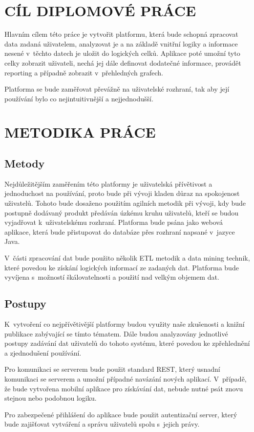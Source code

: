 \chapter*{CÍL DIPLOMOVÉ PRÁCE}
Hlavním cílem této práce je vytvořit platformu, která bude schopná zpracovat data zadaná uživatelem, analyzovat je a na základě vnitřní logiky a informace nesené v~těchto datech je uložit do logických celků. Aplikace poté umožní tyto celky zobrazit uživateli, nechá jej dále definovat dodatečné informace, provádět reporting a případně zobrazit v~přehledných grafech.

Platforma se bude zaměřovat převážně na uživatelské rozhraní, tak aby její používání bylo co nejintuitivnější a nejjednodušší.

\chapter*{METODIKA PRÁCE}
\section*{Metody}
\par Nejdůležitějším zaměřením této platformy je uživatelská přívětivost a jednoduchost na používání, proto bude při vývoji kladen důraz na spokojenost uživatelů. Tohoto bude dosaženo použitím agilních metodik při vývoji, kdy bude postupně dodávaný produkt předáván úzkému kruhu uživatelů, kteří se budou vyjadřovat k~uživatelskému rozhraní. Platforma bude psána jako webová aplikace, která bude přistupovat do databáze přes rozhraní napsané v~jazyce Java.
\par V~části zpracování dat bude použito několik ETL metodik a data mining technik, které povedou ke získání logických informací ze zadaných dat. Platforma bude vyvíjena s~možností 
škálovatelnosti a použití nad velkým objemem dat.

\section*{Postupy}
\par K~vytvoření co nejpřívětivější platformy budou využity naše zkušenosti a knižní publikace zabývající se tímto tématem. Dále budou analyzovány jednotlivé postupy zadávání dat uživatelů do tohoto systému, které povedou ke zpřehlednění a zjednodušení používání.
\par Pro komunikaci se serverem bude použit standard REST, který usnadní komunikaci se serverem a umožní případné navázání nových aplikací. V~případě, že bude vytvořena mobilní aplikace pro získávání dat, nebude nutné psát znovu stejnou nebo podobnou logiku.
\par Pro zabezpečené přihlášení do aplikace bude použit autentizační server, který bude zajišťovat vytváření a správu uživatelů spolu s~jejich právy.

